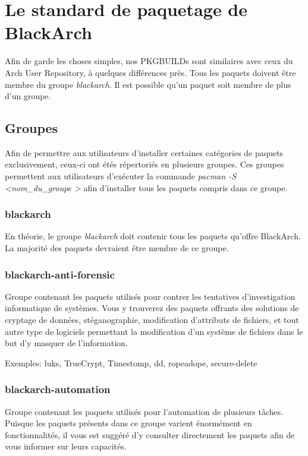 \documentclass[a4paper, oneside, 11pt]{book}
\begin{document}
\section{Le standard de paquetage de BlackArch}

Afin de garde les choses simples, nos PKGBUILDs sont similaires avec ceux du
Arch User Repository, à quelques différences près. Tous les paquets doivent
être membre du groupe \textit{blackarch}. Il est possible qu'un paquet soit
membre de plus d'un groupe.

\subsection{Groupes}

Afin de permettre aux utilisateurs d'installer certaines catégories de paquets
exclusivement, ceux-ci ont étés répertoriés en plusieurs groupes. Ces groupes
permettent aux utilisateurs d'exécuter la commande
\textit{pacman -S \textless nom\_du\_groupe \textgreater } afin d'installer tous
 les paquets compris dans ce groupe.

\subsubsection{blackarch}

En théorie, le groupe \textit{blackarch} doit contenir tous les paquets qu'offre
BlackArch. La majorité des paquets devraient être membre de ce groupe.

\subsubsection{blackarch-anti-forensic}

Groupe contenant les paquets utilisés pour contrer les tentatives
d'investigation informatique de systèmes. Vous y trouverez des paquets offrants
des solutions de cryptage de données, stéganographie, modification d'attributs
de fichiers, et tout autre type de logiciels permettant la modification d'un
système de fichiers dans le but d'y masquer de l'information.

Exemples: luks, TrueCrypt, Timestomp, dd, ropeadope, secure-delete

\subsubsection{blackarch-automation}

Groupe contenant les paquets utilisés pour l'automation de plusieurs tâches.
Puisque les paquets présents dans ce groupe varient énormément en
fonctionnalités, il vous est suggéré d'y consulter directement les paquets
afin de vous informer sur leurs capacités.
\end{document}
